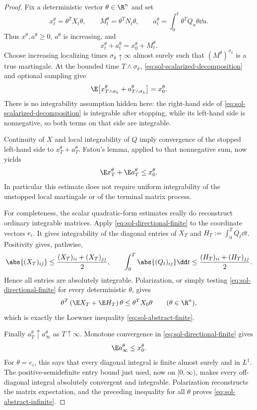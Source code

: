 \documentclass[../main.tex]{subfiles}
\begin{document}
\begin{proof}
Fix a deterministic vector $\theta\in\R^n$ and set
\[
 x_t^\theta=\theta^TX_t\theta,
 \qquad
 M_t^\theta=\theta^TN_t\theta,
 \qquad
 a_t^\theta=\int_0^t\theta^TQ_u\theta\dd u.
\]
Thus $x^\theta,a^\theta\geq0$, $a^\theta$ is increasing, and
\begin{equation}
 x_t^\theta+a_t^\theta=x_0^\theta+M_t^\theta.
 \label{eq:sol-scalarized-decomposition}
\end{equation}
Choose increasing localizing times $\sigma_k\uparrow\infty$ almost surely such that
$(M^\theta)^{\sigma_k}$ is a true martingale.  At the bounded time $T\wedge\sigma_k$,
\eqref{eq:sol-scalarized-decomposition} and optional sampling give
\begin{equation}
 \E\bigl[x_{T\wedge\sigma_k}^\theta+a_{T\wedge\sigma_k}^\theta\bigr]
 =x_0^\theta.
 \label{eq:sol-stopped-expectation}
\end{equation}
There is no integrability assumption hidden here: the right-hand side of
\eqref{eq:sol-scalarized-decomposition} is integrable after stopping, while its left-hand side
is nonnegative, so both terms on that side are integrable.

Continuity of $X$ and local integrability of $Q$ imply convergence of the stopped left-hand
side to $x_T^\theta+a_T^\theta$.  Fatou's lemma, applied to that nonnegative sum, now yields
\begin{equation}
 \E x_T^\theta+\E a_T^\theta\leq x_0^\theta.
 \label{eq:sol-directional-finite}
\end{equation}
In particular this estimate does not require uniform integrability of the unstopped local
martingale or of the terminal matrix process.

For completeness, the scalar quadratic-form estimates really do reconstruct ordinary
integrable matrices.  Apply \eqref{eq:sol-directional-finite} to the coordinate vectors
$e_i$.  It gives integrability of the diagonal entries of $X_T$ and
$H_T:=\int_0^TQ_t\dd t$.  Positivity gives, pathwise,
\[
 \abs{(X_T)_{ij}}\leq\frac{(X_T)_{ii}+(X_T)_{jj}}2,
 \qquad
 \int_0^T\abs{(Q_t)_{ij}}\dd t
 \leq\frac{(H_T)_{ii}+(H_T)_{jj}}2.
\]
Hence all entries are absolutely integrable.  Polarization, or simply testing
\eqref{eq:sol-directional-finite} for every deterministic $\theta$, gives
\[
 \theta^T\left(\E X_T+\E H_T\right)\theta
 \leq\theta^TX_0\theta
 \qquad(\theta\in\R^n),
\]
which is exactly the Loewner inequality \eqref{eq:sol-abstract-finite}.

Finally $a_T^\theta\uparrow a_\infty^\theta$ as $T\uparrow\infty$.  Monotone convergence in
\eqref{eq:sol-directional-finite} gives
\[
 \E a_\infty^\theta\leq x_0^\theta.
\]
For $\theta=e_i$, this says that every diagonal integral is finite almost surely and in
$L^1$.  The positive-semidefinite entry bound just used, now on $[0,\infty)$, makes every
off-diagonal integral absolutely convergent and integrable.  Polarization reconstructs the
matrix expectation, and the preceding inequality for all $\theta$ proves
\eqref{eq:sol-abstract-infinite}.
\end{proof}
\end{document}
